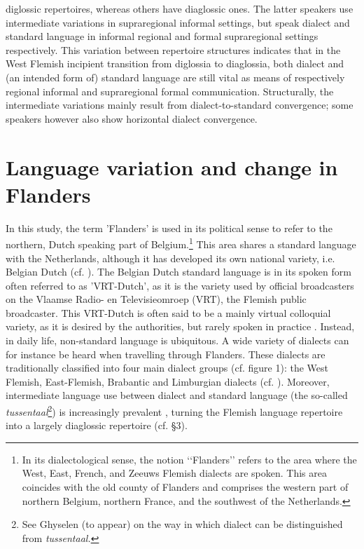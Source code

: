 \documentclass[output=paper]{LSP/langsci}
\begin{document}
diglossic repertoires, whereas others have diaglossic ones. The latter speakers use intermediate variations in supraregional informal settings, but speak dialect and standard language in informal regional and formal supraregional settings respectively. This variation between repertoire structures indicates that in the West Flemish incipient transition from diglossia to diaglossia, both dialect and (an intended form of) standard language are still vital as means of respectively regional informal and supraregional formal communication. Structurally, the intermediate variations mainly result from dialect-to-standard convergence; some speakers however also show horizontal dialect convergence.

\section{Language variation and change in Flanders}

In this study, the term 'Flanders' is used in its political sense to refer to the northern, Dutch speaking part of Belgium.\footnote{In its dialectological sense, the notion ‘‘Flanders’’ refers to the area where the West, East, French, and Zeeuws Flemish dialects are spoken. This area coincides with the old county of Flanders and comprises the western part of northern Belgium, northern France, and the southwest of the Netherlands.} This area shares a standard language with the Netherlands, although it has developed its own national variety, i.e. Belgian Dutch (cf. \citealt{grondelaers_standard_2011}). The Belgian Dutch standard language is in its spoken form often referred to as 'VRT-Dutch', as it is the variety used by official broadcasters on the Vlaamse Radio- en Televisieomroep (VRT), the Flemish public broadcaster. This VRT-Dutch is often said to be a mainly virtual colloquial variety, as it is desired by the authorities, but rarely spoken in practice \citep[19]{de_caluwe_tussentaal_2009}. Instead, in daily life, non-standard language is ubiquitous. A wide variety of dialects can for instance be heard when travelling through Flanders. These dialects are traditionally classified into four main dialect groups (cf. figure 1): the West Flemish, East-Flemish, Brabantic and Limburgian dialects (cf. \citealt{vandekerckhove_dialect_2009}). Moreover, intermediate language use between dialect and standard language (the so-called \textit{tussentaal}\footnote{See Ghyselen (to appear) on the way in which dialect can be distinguished from \textit{tussentaal.}}) is increasingly prevalent \citep{de_caluwe_tussentaal_2006}, turning the Flemish language repertoire into a largely diaglossic repertoire (cf. §3).
\end{document}

